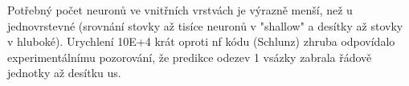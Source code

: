 Potřebný počet neuronů ve vnitřních vrstvách je výrazně menší, než u jednovrstevné (srovnání stovky až tisíce neuronů 
v "shallow" a desítky až stovky v hluboké). Urychlení 10E+4 krát oproti nf kódu (Schlunz) zhruba odpovídalo 
experimentálnímu pozorování, že predikce odezev 1 vsázky zabrala řádově jednotky až desítku us.








